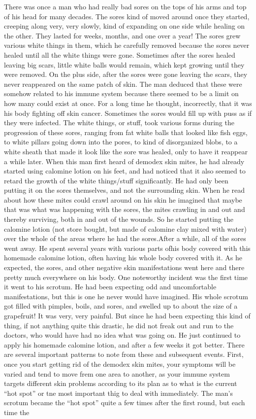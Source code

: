 \documentclass[12pt,letterpaper]{book}
\begin{document}
There was once a man who had really bad sores on the tops of his arms and top of his head for many decades. The sores kind of moved around once they started, creeping along very, very slowly, kind of expanding on one side while healing on the other. They lasted for weeks, months, and one over a year! The sores grew various white things in them, which he carefully removed because the sores never healed until all the white things were gone. Sometimes after the sores healed leaving big scars, little white balls would remain, which kept growing until they were removed. On the plus side, after the sores were gone leaving the scars, they never reappeared on the same patch of skin. The man deduced that these were somehow related to his immune system because there seemed to be a limit on how many could exist at once. For a long time he thought, incorrectly, that it was his body fighting off skin cancer. Sometimes the sores would fill up with puss as if they were infected. The white things, or stuff, took various forms during the progression of these sores, ranging from fat white balls that looked like fish eggs, to white pillars going down into the pores, to kind of disorganized blobs, to a white sheath that made it look like the sore was healed, only to have it reappear a while later. When this man first heard of demodex skin mites, he had already started using calomine lotion on his feet, and had noticed that it also seemed to retard the growth of the white things/stuff significantly. He had only been putting it on the sores themselves, and not the surrounding skin. When he read about how these mites could crawl around on his skin he imagined that maybe that was what was happening with the sores, the mites crawling in and out and thereby surviving, both in and out of the wounds. So he started putting the calomine lotion (not store bought, but made of calomine clay mixed with water) over the whole of the areas where he had the sores.After a while, all of the sores went away. He spent several years with various parts ofhis body covered with this homemade calomine lotion, often having his whole body covered with it. As he expected, the sores, and other negative skin manifestations went here and there pretty much everywhere on his body. One noteworthy incident was the first time it went to his scrotum. He had been expecting odd and uncomfortable manifestations, but this is one he never would have imagined. His whole scrotum got filled with pimples, boils, and sores, and swelled up to about the size of a grapefruit! It was very, very painful. But since he had been expecting this kind of thing, if not anything quite this drastic, he did not freak out and run to the doctors, who would have had no idea what was going on. He just continued to apply his homemade calomine lotion, and after a few weeks it got better. There are several important patterns to note from these and subsequent events. First, once you start getting rid of the demodex skin mites, your symptoms will be varied and tend to move frem one area to another, as your immune system targets different skin problems according to its plan as to what is the current ``hot spot'' or tne most important thig to deal with immediately. The man's scrotum became the ``hot spot'' quite a few times after the first round, but each time the 
\end{document}
